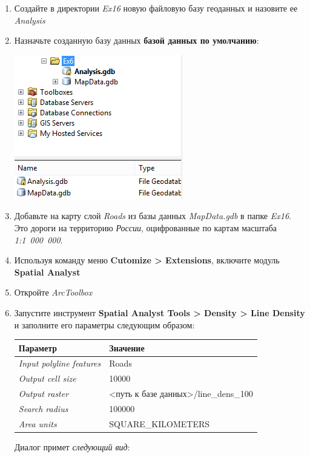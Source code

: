 \documentclass[12pt,]{book}
\begin{document}
\begin{enumerate}
\def\labelenumi{\arabic{enumi}.}
\item
  Создайте в директории \emph{Ex16} новую файловую базу геоданных и назовите ее \emph{Analysis}
\item
  Назначьте созданную базу данных \textbf{базой данных по умолчанию}:

  \includegraphics{images/Ex16/image5.png}
\item
  Добавьте на карту слой \emph{Roads} из базы данных \emph{MapData.gdb} в папке \emph{Ex16}. Это дороги на территорию \emph{России}, оцифрованные по картам масштаба \emph{1:1~000~000}.
\item
  Используя команду меню \textbf{Cutomize \textgreater{} Extensions}, включите модуль \textbf{Spatial Analyst}
\item
  Откройте \emph{ArcToolbox}
\item
  Запустите инструмент \textbf{Spatial Analyst Tools \textgreater{} Density \textgreater{} Line Density} и заполните его параметры следующим образом:

  \begin{longtable}[]{@{}ll@{}}
  \toprule
  Параметр & Значение\tabularnewline
  \midrule
  \endhead
  \emph{Input polyline features} & Roads\tabularnewline
  \emph{Output cell size} & 10000\tabularnewline
  \emph{Output raster} & \textless{}путь к базе данных\textgreater{}/line\_dens\_100\tabularnewline
  \emph{Search radius} & 100000\tabularnewline
  \emph{Area units} & SQUARE\_KILOMETERS\tabularnewline
  \bottomrule
  \end{longtable}

  Диалог примет \emph{следующий вид}:


\end{enumerate}
\end{document}
